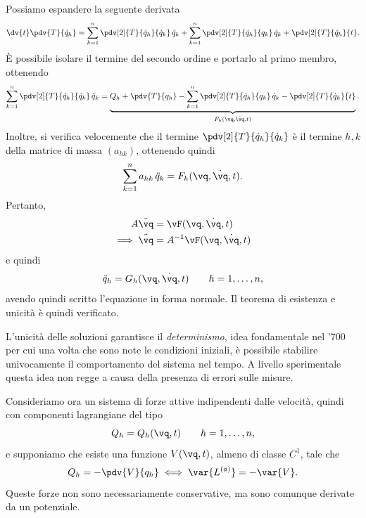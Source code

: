 Possiamo espandere la seguente derivata
\begin{equation*}
    \dv{t}\pdv{T}{\dot{q}_h} = \sum_{k=1}^n \pdv[2]{T}{\dot{q}_h}{\dot{q}_k}\,\ddot{q}_k + \sum_{k=1}^n \pdv[2]{T}{\dot{q}_h}{q_k}\,\dot{q}_k + \pdv[2]{T}{\dot{q}_h}{t}.
\end{equation*}
È possibile isolare il termine del secondo ordine e portarlo al primo membro, ottenendo
\begin{equation*}
    \sum_{k=1}^n \pdv[2]{T}{\dot{q}_h}{\dot{q}_k}\,\ddot{q}_k = \underbrace{Q_h + \pdv{T}{q_h} - \sum_{k=1}^n \pdv[2]{T}{\dot{q}_h}{q_k}\,\dot{q}_k - \pdv[2]{T}{\dot{q}_h}{t}}_{F_h(\vq, \dot{\vq}, t)}.
\end{equation*}
Inoltre, si verifica velocemente che il termine $\pdv[2]{T}{\dot{q}_h}{\dot{q}_k}$ è il termine $h, k$ della matrice di massa $(a_{hk})$, ottenendo quindi
\begin{equation*}
    \sum_{k=1}^n a_{hk}\,\ddot{q}_k = F_h(\vq, \dot{\vq}, t).
\end{equation*}
Pertanto,
\begin{align*}
    A \ddot{\vq} &= \vF(\vq, \dot{\vq}, t) \\
    \implies \ddot{\vq} &  = A^{-1} \vF(\vq, \dot{\vq}, t)
\end{align*}
e quindi
\begin{equation*}
    \ddot{q}_h= G_h(\vq, \dot{\vq}, t) \qquad h = 1, \dots, n,
\end{equation*}
avendo quindi scritto l'equazione in forma normale. Il teorema di esistenza e unicità è quindi verificato.

 L'unicità delle soluzioni garantisce il \emph{determinismo}, idea fondamentale nel '700 per cui una volta che sono note le condizioni iniziali, è possibile stabilire univocamente il comportamento del sistema nel tempo. A livello sperimentale questa idea non regge a causa della presenza di errori sulle misure.

Consideriamo ora un sistema di forze attive indipendenti dalle velocità, quindi con componenti lagrangiane del tipo
\begin{equation*}
    Q_h = Q_h(\vq, t) \qquad h = 1, \dots, n,
\end{equation*}
e supponiamo che esiste una funzione $V(\vq, t)$, almeno di classe $C^1$, tale che
\begin{equation*}
    Q_h = -\pdv{V}{q_h} \iff \var{L^{(a)}} = -\var{V}.
\end{equation*}
Queste forze non sono necessariamente conservative, ma sono comunque derivate da un potenziale.

